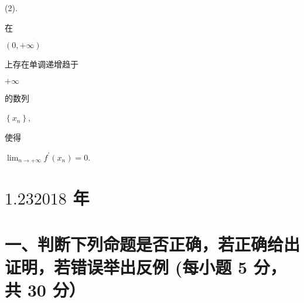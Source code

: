 \documentclass[10pt]{article}
\begin{document}
(2). \begin{CJK}{UTF8}{mj}在\end{CJK} $(0,+\infty)$ \begin{CJK}{UTF8}{mj}上存在单调递增趋于\end{CJK} $+\infty$ \begin{CJK}{UTF8}{mj}的数列\end{CJK} $\left\{x_{n}\right\}$, \begin{CJK}{UTF8}{mj}使得\end{CJK} $\lim _{n \rightarrow+\infty} f^{\prime}\left(x_{n}\right)=0$.

\section{$1.232018$ 年}
\section{一、判断下列命题是否正确，若正确给出证明，若错误举出反例 (每小题 5 分，共 30 分）}
\end{document}
